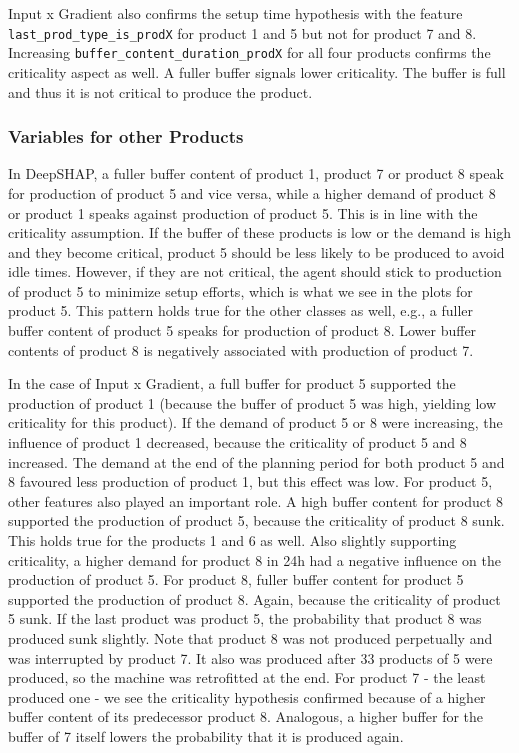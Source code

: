 Input x Gradient also confirms the setup time hypothesis with the feature \texttt{last\_prod\_type\_is\_prodX} for product 1 and 5 but not for product 7 and 8.
Increasing \texttt{buffer\_content\_duration\_prodX} for all four products confirms the criticality aspect as well. A fuller buffer signals lower criticality. The buffer is full and thus it is not critical to produce the product.

\subsubsection{Variables for other Products}
In DeepSHAP, a fuller buffer content of product 1, product 7 or product 8 speak for production of product 5 and vice versa, while a higher demand of product 8 or product 1 speaks against production of product 5. This is in line with the criticality assumption. If the buffer of these products is low or the demand is high and they become critical, product 5 should be less likely to be produced to avoid idle times. However, if they are not critical, the agent should stick to production of product 5 to minimize setup efforts, which is what we see in the plots for product 5.
This pattern holds true for the other classes as well, e.g., a fuller buffer content of product 5 speaks for production of product 8. Lower buffer contents of product 8 is negatively associated with production of product 7.

In the case of Input x Gradient, a full buffer for product 5 supported the production of product 1 (because the buffer of product 5 was high, yielding low criticality for this product). If the demand of product 5 or 8 were increasing, the influence of product 1 decreased, because the criticality of product 5 and 8 increased. The demand at the end of the planning period for both product 5 and 8 favoured less production of product 1, but this effect was low.
For product 5, other features also played an important role. A high buffer content for product 8 supported the production of product 5, because the criticality of product 8 sunk. This holds true for the products 1 and 6 as well. Also slightly supporting criticality, a higher demand for product 8 in 24h had a negative influence on the production of product 5.
For product 8, fuller buffer content for product 5 supported the production of product 8. Again, because the criticality of product 5 sunk. If the last product was product 5, the probability that product 8 was produced sunk slightly. Note that product 8 was not produced perpetually and was interrupted by product 7. It also was produced after 33 products of 5 were produced, so the machine was retrofitted at the end.
For product 7 - the least produced one - we see the criticality hypothesis confirmed because of a higher buffer content of its predecessor product 8. Analogous, a higher buffer for the buffer of 7 itself lowers the probability that it is produced again.

